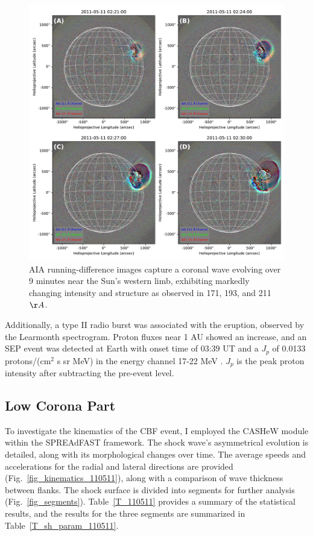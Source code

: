 \begin{figure}[!htp] %
	\centerline{\includegraphics[width=0.8\columnwidth]{chapter2/figs/RGB_panel.pdf}}
	\caption{AIA running-difference images capture a coronal wave evolving over 9 minutes near the Sun's western limb, exhibiting markedly changing intensity and structure as observed in 171, 193, and 211 $\AA$.}
	\label{fig_aia_event}
\end{figure}

Additionally, a type II radio burst was associated with the eruption, observed by the Learmonth spectrogram. Proton fluxes near 1 AU showed an increase, and an SEP event was detected at Earth with onset time of 03:39 UT and a $J_p$ of 0.0133 protons/(cm$^2$ s sr MeV) in the energy channel 17-22 MeV \citep{miteva_2016, miteva_2017}.  $J_p$ is the peak proton intensity after subtracting the pre-event level.

\subsection{Low Corona Part}
To investigate the kinematics of the CBF event, I employed the CASHeW module within the SPREAdFAST framework. The shock wave's asymmetrical evolution is detailed, along with its morphological changes over time. The average speeds and accelerations for the radial and lateral directions are provided (Fig.~\ref{fig_kinematics_110511}), along with a comparison of wave thickness between flanks. The shock surface is divided into segments for further analysis (Fig.~\ref{fig_segments}). Table~\ref{T_110511} provides a summary of the statistical results, and the results for the three segments are summarized in Table~\ref{T_sh_param_110511}.

